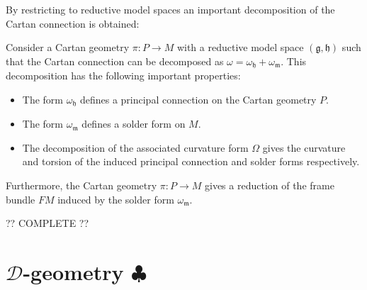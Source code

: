     By restricting to reductive model spaces an important decomposition of the Cartan connection is obtained:
    \begin{property}
        Consider a Cartan geometry $\pi:P\rightarrow M$ with a reductive model space $(\mathfrak{g},\mathfrak{h})$ such that the Cartan connection can be decomposed as $\omega=\omega_{\mathfrak{h}}+\omega_{\mathfrak{m}}$. This decomposition has the following important properties:
        \begin{itemize}
            \item The form $\omega_\mathfrak{h}$ defines a principal connection on the Cartan geometry $P$.
            \item The form $\omega_\mathfrak{m}$ defines a solder form on $M$.
            \item The decomposition of the associated curvature form $\Omega$ gives the curvature and torsion of the induced principal connection and solder forms respectively.
        \end{itemize}
        Furthermore, the Cartan geometry $\pi:P\rightarrow M$ gives a reduction of the frame bundle $FM$ induced by the solder form $\omega_\mathfrak{m}$.
    \end{property}
    ?? COMPLETE ??

\section{\texorpdfstring{$\mathcal{D}$-geometry $\clubsuit$}{D-geometry}}


